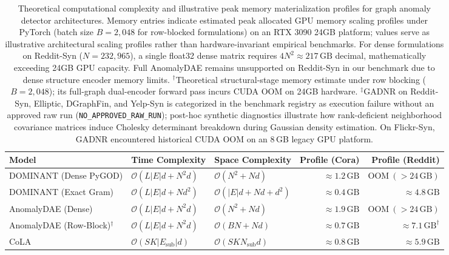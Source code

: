 \documentclass[11pt,a4paper]{article}
\begin{document}
\begin{table}[htbp]
\centering\footnotesize\setlength{\tabcolsep}{3pt}
\caption{Theoretical computational complexity and illustrative peak memory materialization profiles for graph anomaly detector architectures. Memory entries indicate estimated peak allocated GPU memory scaling profiles under PyTorch (batch size $B=2{,}048$ for row-blocked formulations) on an RTX 3090 24GB platform; values serve as illustrative architectural scaling profiles rather than hardware-invariant empirical benchmarks. For dense formulations on Reddit-Syn ($N=232,965$), a single float32 dense matrix requires $4 N^2 \approx 217\,\mathrm{GB}$ decimal, mathematically exceeding 24GB GPU capacity. Full AnomalyDAE remains unsupported on Reddit-Syn in our benchmark due to dense structure encoder memory limits. $^\dagger$Theoretical structural-stage memory estimate under row blocking ($B=2{,}048$); its full-graph dual-encoder forward pass incurs CUDA OOM on 24GB hardware. $^\ddagger$GADNR on Reddit-Syn, Elliptic, DGraphFin, and Yelp-Syn is categorized in the benchmark registry as execution failure without an approved raw run (\texttt{NO\_APPROVED\_RAW\_RUN}); post-hoc synthetic diagnostics illustrate how rank-deficient neighborhood covariance matrices induce Cholesky determinant breakdown during Gaussian density estimation. On Flickr-Syn, GADNR encountered historical CUDA OOM on an 8\,GB legacy GPU platform.}
\label{tab:complexity_comparison}
\begin{tabularx}{\textwidth}{lXXrr}\toprule
\textbf{Model} & \textbf{Time Complexity} & \textbf{Space Complexity} & \textbf{Profile (Cora)} & \textbf{Profile (Reddit)} \\\midrule
DOMINANT (Dense PyGOD) & $\mathcal{O}(L |E| d + N^2 d)$ & $\mathcal{O}(N^2 + N d)$ & $\approx 1.2\,\mathrm{GB}$ & $\mathrm{OOM}\ (>24\,\mathrm{GB})$ \\
DOMINANT (Exact Gram) & $\mathcal{O}(L |E| d + N d^2)$ & $\mathcal{O}(|E| d + N d + d^2)$ & $\approx 0.4\,\mathrm{GB}$ & $\approx 4.8\,\mathrm{GB}$ \\
AnomalyDAE (Dense) & $\mathcal{O}(L |E| d + N^2 d)$ & $\mathcal{O}(N^2 + N d)$ & $\approx 1.9\,\mathrm{GB}$ & $\mathrm{OOM}\ (>24\,\mathrm{GB})$ \\
AnomalyDAE (Row-Block)$^\dagger$ & $\mathcal{O}(L |E| d + N^2 d)$ & $\mathcal{O}(B N + N d)$ & $\approx 0.7\,\mathrm{GB}$ & $\approx 7.1\,\mathrm{GB}^\dagger$ \\
CoLA & $\mathcal{O}(S K |E_{\mathrm{sub}}| d)$ & $\mathcal{O}(S K N_{\mathrm{sub}} d)$ & $\approx 0.8\,\mathrm{GB}$ & $\approx 5.9\,\mathrm{GB}$ \\

\end{tabularx}
\end{table}
\end{document}
